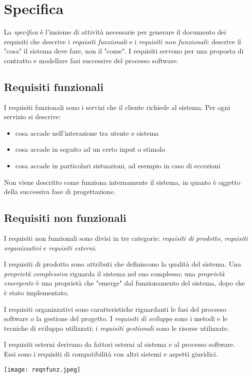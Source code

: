 \documentclass[11pt]{article}
\begin{document}
\section{Specifica}
La \textit{specifica} è l'insieme di attività necessarie per generare il documento dei requisiti che descrive i 
\textit{requisiti funzionali} e i \textit{requisiti non funzionali}: descrive il "cosa" il sistema deve fare, non il "come".
I requisiti servono per una proposta di contratto e modellare fasi successive del processo software.
\subsection{Requisiti funzionali}
I requisiti funzionali sono i servizi che il cliente richiede al sistema. Per ogni servizio si descrive:
\begin{itemize}
    \item cosa accade nell'interazione tra utente e sistema 
    \item cosa accade in seguito ad un certo input o stimolo
    \item cosa accade in particolari sistuazioni, ad esempio in caso di eccezioni
\end{itemize}
Non viene descritto come funziona internamente il sistema, in quanto è oggetto della successiva fase di progettazione.
\subsection{Requisiti non funzionali}
I requisiti non funzionali sono divisi in tre categorie: \textit{requisiti di prodotto}, \textit{requisiti organizzativi}
e \textit{requisiti esterni}.

I requisiti di prodotto sono attributi che definiscono la qualità del sistema. Una \textit{proprietà complessiva} riguarda
il sistema nel suo complesso; una \textit{proprietà emergente} è una proprietà che "emerge" dal funzionamento del sistema, 
dopo che è stato implementato.

I requisiti organizzativi sono caratteristiche riguardanti le fasi del processo software o la gestione del progetto. I 
\textit{requisiti di sviluppo} sono i metodi e le tecniche di sviluppo utilizzati; i \textit{requisiti gestionali} sono
le risorse utilizzate.

I requisiti esterni derivano da fattori esterni al sistema e al processo software. Essi sono i requisiti di compatibilità
con altri sistemi e aspetti giuridici.
\begin{center}
    \texttt{[image: reqnfunz.jpeg]}
\end{center}
\end{document}

